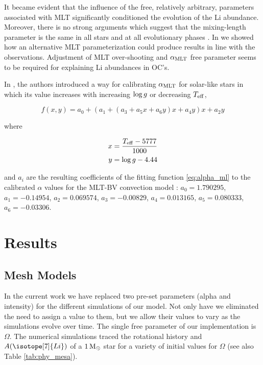 \documentclass[fleqn,usenatbib]{mnras}
\begin{document}
 It became evident that the influence of the free, relatively arbitrary, parameters associated with MLT significantly conditioned the evolution of the Li abundance. Moreover, there is no strong arguments which suggest that the mixing-length parameter is the same in all stars and at all evolutionary phases \citep{Pasetto2014}. In \cite{Navarro2020} we showed how an alternative MLT parameterization could produce results in line with the observations. Adjustment of MLT over-shooting and $\alpha_{\mathrm{MLT}}$ free parameter seems to be required for explaining Li abundances in OC's.\par

In \cite{Sonoi2018}, the authors introduced a way for calibrating $\alpha_{\mathrm{MLT}}$ for solar-like stars in which its value increases with increasing $\mathrm{log} \, g$ or decreasing $T_{\mathrm{eff}}$,

\begin{ceqn}
\begin{equation}
 f(x,y) = a_0 + (a_1 + (a_3 + a_5x +a_6y)x + a_4y)x + a_2y\label{eq:alpha_ml}
\end{equation}
\end{ceqn}
where
\begin{ceqn}
\begin{align}
     x &= \frac{T_{\mathrm{eff}}-5777}{1000} \label{eq:eq:alpha_x}\\
     y &= \mathrm{log} \, g-4.44 \label{eq:eq:alpha_y}
\end{align}
\end{ceqn}
and $a_i$ are the resulting coefficients of the fitting function \ref{eq:alpha_ml} to the calibrated $\alpha$ values for the MLT-BV convection model \citep{Sonoi2018}: $a_0=1.790295$, $a_1=-0.14954$, $a_2=0.069574$, $a_3=-0.00829$, $a_4=0.013165$, $a_5=0.080333$, $a_6=-0.03306$.\par

\section{Results} \label{sec_3}

\subsection{Mesh Models} \label{sec_mesh}
In the current work we have replaced two pre-set parameters (alpha and intensity) for the different simulations of our model. Not only have we eliminated the need to assign a value to them, but we allow their values to vary as the simulations evolve over time. The single free parameter of our implementation is $\Omega$. The numerical simulations traced the rotational history and $A(\isotope[7]{Li})$ of a $1\, \mathrm{M}_\odot$ star for a variety of initial values for $\Omega$ (see also Table \ref{tab:phy_mesa}).\par
\end{document}
